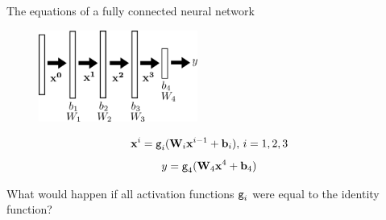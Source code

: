 \documentclass[xcolor=pdftex,dvipsnames,table,mathserif]{beamer}
\begin{document}
\begin{frame}{The equations of a fully connected neural network}

    \begin{figure}
      \includegraphics[height=3cm]{nn_representation2}
    \end{figure}

    \begin{block}{}
      \[\mathbf{x}^i = \texttt{g}_i(\mathbf{W}_i\mathbf{x}^{i-1} + \mathbf{b}_i),\, i= 1, 2, 3 \]
      \[y = \texttt{g}_4(\mathbf{W}_4\mathbf{x}^4 + \mathbf{b}_4)\]
    \end{block}

    \pause

    What would happen if all activation functions $\texttt{g}_i$ were equal to the identity function?

\end{frame}

\end{document}
